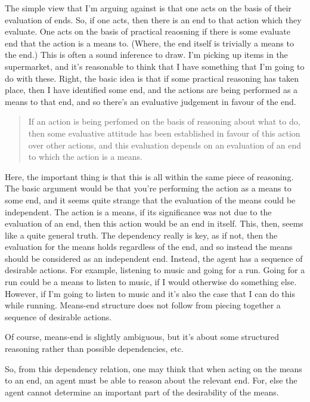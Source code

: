 \documentclass[10pt]{article}
\begin{document}
The simple view that I'm arguing against is that one acts on the basis of their evaluation of ends.
So, if one acts, then there is an end to that action which they evaluate.
One acts on the basis of practical reaosning if there is some evaluate end that the action is a means to.
(Where, the end itself is trivially a means to the end.)
This is often a sound inference to draw.
I'm picking up items in the supermarket, and it's reasonable to think that I have something that I'm going to do with these.
Right, the basic idea is that if some practical reasoning has taken place, then I have identified some end, and the actions are being performed as a means to that end, and so there's an evaluative judgement in favour of the end.

\begin{quote}
  If an action is being perfomed on the basis of reasoning about what to do, then some evaluative attitude has been established in favour of this action over other actions, and this evaluation depends on an evaluation of an end to which the action is a means.
\end{quote}
Here, the important thing is that this is all within the same piece of reasoning.
The basic argument would be that you're performing the action as a means to some end, and it seems quite strange that the evaluation of the means could be independent.
The action is a means, if its significance was not due to the evaluation of an end, then this action would be an end in itself.
This, then, seems like a quite general truth.
The dependency really is key, as if not, then the evaluation for the means holds regardless of the end, and so instead the means should be considered as an independent end.
Instead, the agent has a sequence of desirable actions.
For example, listening to music and going for a run.
Going for a run could be a means to listen to music, if I would otherwise do something else.
However, if I'm going to listen to music and it's also the case that I can do this while running.
Means-end structure does not follow from piecing together a sequence of desirable actions.

Of course, means-end is slightly ambiguous, but it's about some structured reasoning rather than possible dependencies, etc.

So, from this dependency relation, one may think that when acting on the means to an end, an agent must be able to reason about the relevant end.
For, else the agent cannot determine an important part of the desirability of the means.
\end{document}
